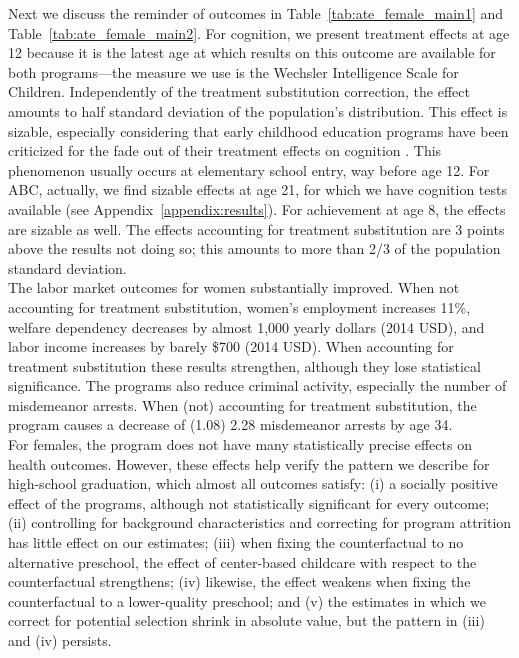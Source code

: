 \noindent Next we discuss the reminder of outcomes in Table~\ref{tab:ate_female_main1} and Table~\ref{tab:ate_female_main2}. For cognition, we present treatment effects at age 12 because it is the latest age at which results on this outcome are available for both programs---the measure we use is the Wechsler Intelligence Scale for Children. Independently of the treatment substitution correction, the effect amounts to half standard deviation of the population's distribution. This effect is sizable, especially considering that early childhood education programs have been criticized for the fade out of their treatment effects on cognition \citep{Elango_Hojman_etal_2015_Early-Edu}. This phenomenon usually occurs at elementary school entry, way before age 12. For ABC, actually, we find sizable effects at age 21, for which we have cognition tests available (see Appendix~\ref{appendix:results}). For achievement at age 8, the effects are sizable as well. The effects accounting for treatment substitution are 3 points above the results not doing so; this amounts to more than 2/3 of the population standard deviation.\\

\noindent The labor market outcomes for women substantially improved. When not accounting for treatment substitution, women's employment increases 11\%, welfare dependency decreases by almost 1,000 yearly dollars (2014 USD), and labor income increases by barely \$700 (2014 USD). When accounting for treatment substitution these results strengthen, although they lose statistical significance. The programs also reduce criminal activity, especially the number of misdemeanor arrests. When (not) accounting for treatment substitution, the program causes a decrease of (1.08) 2.28 misdemeanor arrests by age 34.\\

\noindent For females, the program does not have many statistically precise effects on health outcomes. However, these effects help verify the pattern we describe for high-school graduation, which almost all outcomes satisfy: (i) a socially positive effect of the programs, although not statistically significant for every outcome; (ii) controlling for background characteristics and correcting for program attrition has little effect on our estimates; (iii) when fixing the counterfactual to no alternative preschool, the effect of center-based childcare with respect to the counterfactual strengthens; (iv) likewise, the effect weakens when fixing the counterfactual to a lower-quality preschool; and (v) the estimates in which we correct for potential selection shrink in absolute value, but the pattern in (iii) and (iv) persists.\\

